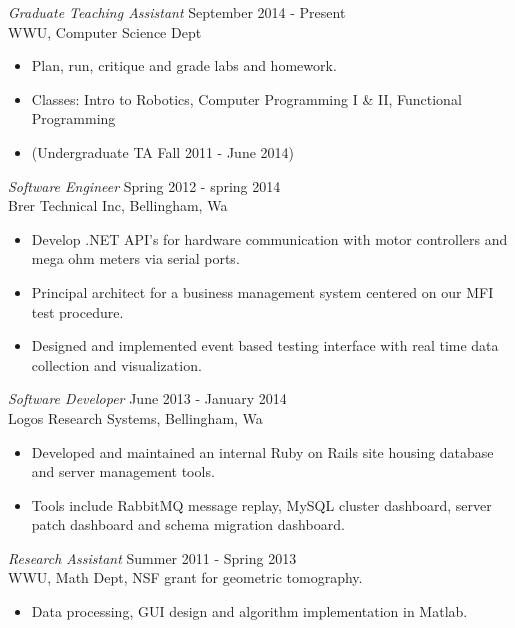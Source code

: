 \documentclass[line,margin]{res}
\begin{document}
\begin{resume}
                	{\sl Graduate Teaching Assistant} \hfill        September 2014 - Present \\
                	WWU, Computer Science Dept
                  	\begin{itemize} \itemsep -2pt
                   		\item Plan, run, critique and grade labs and homework.
			\item Classes: Intro to Robotics, Computer Programming I \& II, Functional Programming
			\item (Undergraduate TA Fall 2011 - June 2014)
                   	\end{itemize}

		{\sl Software Engineer} \hfill Spring 2012 - spring 2014 \\
                	Brer Technical Inc, Bellingham, Wa
                	\begin{itemize}  \itemsep -2pt
                		\item Develop .NET API's for hardware communication with motor controllers and mega ohm meters via serial ports.
                		\item Principal architect for a business management system centered on our MFI test procedure.
			\item Designed and implemented event based testing interface with real time data collection and visualization.  
               	 \end{itemize}
 
		{\sl Software Developer} \hfill June 2013 - January 2014 \\
                	Logos Research Systems, Bellingham, Wa
               	 \begin{itemize}  \itemsep -2pt
                		\item Developed and maintained an internal Ruby on Rails site housing database and server management tools. 
	     		\item Tools include RabbitMQ message replay, MySQL cluster dashboard, server patch dashboard and schema migration dashboard.
                	\end{itemize}

                	{\sl Research Assistant} \hfill            Summer 2011 - Spring 2013 \\
                	WWU, Math Dept, NSF grant for geometric tomography.
                 	\begin{itemize}  \itemsep -2pt
                 		\item Data processing, GUI design and algorithm implementation in Matlab.
                 	\end{itemize} 


\end{resume}
\end{document}
